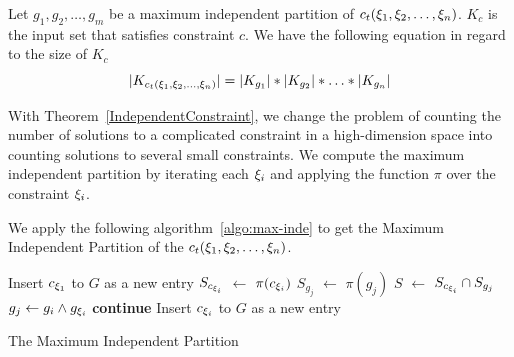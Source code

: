 \begin{theorem}
    \label{IndependentConstraint}
    Let $g_{1}, g_{2}, \ldots, g_{m}$ be a maximum independent partition of
    $c_t({\xi}_{1},{\xi}_{2},\ldots,{\xi}_{n})$.
    $K_c$ is the input set that satisfies constraint $c$. We have the following
    equation in regard to the size of $K_c$
    $$|K_{c_t({\xi}_{1},{\xi}_{2},\ldots,{\xi}_{n})}| = |K_{g_{1}}|*|K_{g_{2}}|*\ldots*|K_{g_{n}}|$$
\end{theorem}
\vspace{-3pt}
With Theorem~\ref{IndependentConstraint}, we change the problem of
counting the number of solutions to a complicated constraint in a high-dimension
space into counting solutions to several small constraints. We compute the
maximum independent partition by iterating each ${\xi}_{i}$ and applying the function
$\pi$ over the constraint ${\xi}_{i}$.

We apply the following
algorithm~\ref{algo:max-inde} to get the Maximum Independent Partition of the
$c_t({\xi}_{1},{\xi}_{2},\ldots,{\xi}_{n})$.


\IncMargin{1em}
\begin{algorithm}[h]\small
    \DontPrintSemicolon
    Insert $c_{{\xi}_{1}}$ to $G$ as a new entry \;
    {
        $S_{c_{{\xi}_{i}}}$ $\leftarrow$ $\pi(c_{{\xi}_{i}})$ \;
        {
            $S_{g_j}$ $\leftarrow$ $\pi(g_{j})$ \;
            $S$ $\leftarrow$ $S_{c_{{\xi}_{i}}} \cap S_{g_j}$  \;
            {
                $g_{j} \leftarrow g_{i} \land g_{{\xi}_{i}}$ \;
                \textbf{continue} \;
            }
            Insert $c_{{\xi}_{i}}$ to $G$ as a new entry \;
        }
    }
    \caption{The Maximum Independent Partition}
    \label{algo:max-inde}
\end{algorithm}
\DecMargin{1em}


